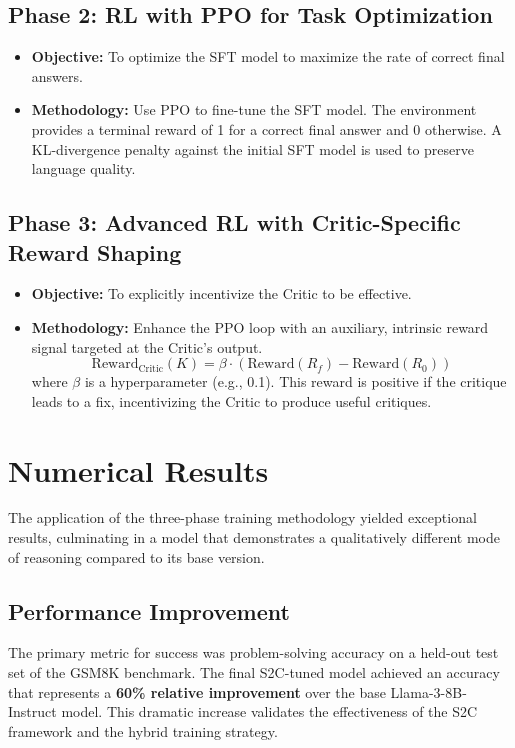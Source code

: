 \documentclass[conference]{IEEEtran}
\begin{document}
\subsection{Phase 2: RL with PPO for Task Optimization}
\begin{itemize}
    \item \textbf{Objective:} To optimize the SFT model to maximize the rate of correct final answers.
    \item \textbf{Methodology:} Use PPO to fine-tune the SFT model. The environment provides a terminal reward of 1 for a correct final answer and 0 otherwise. A KL-divergence penalty against the initial SFT model is used to preserve language quality.
\end{itemize}

\subsection{Phase 3: Advanced RL with Critic-Specific Reward Shaping}
\begin{itemize}
    \item \textbf{Objective:} To explicitly incentivize the Critic to be effective.
    \item \textbf{Methodology:} Enhance the PPO loop with an auxiliary, intrinsic reward signal targeted at the Critic's output.
    \begin{equation}
    \text{Reward}_{\text{Critic}}(K) = \beta \cdot (\text{Reward}(R_f) - \text{Reward}(R_0))
    \end{equation}
    where $\beta$ is a hyperparameter (e.g., 0.1). This reward is positive if the critique leads to a fix, incentivizing the Critic to produce useful critiques.
\end{itemize}

\section{Numerical Results}
The application of the three-phase training methodology yielded exceptional results, culminating in a model that demonstrates a qualitatively different mode of reasoning compared to its base version.

\subsection{Performance Improvement}
The primary metric for success was problem-solving accuracy on a held-out test set of the GSM8K benchmark. The final S2C-tuned model achieved an accuracy that represents a \textbf{60\% relative improvement} over the base Llama-3-8B-Instruct model. This dramatic increase validates the effectiveness of the S2C framework and the hybrid training strategy.
\end{document}
